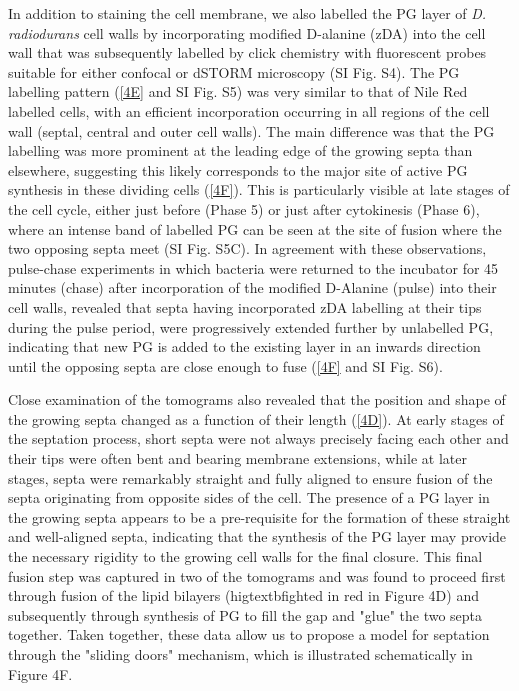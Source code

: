 In addition to staining the cell membrane, we also labelled the PG layer of \textit{D. radiodurans} cell walls by incorporating modified D-alanine (zDA) into the cell wall that was subsequently labelled by click chemistry with fluorescent probes suitable for either confocal or dSTORM microscopy (SI Fig. S4).
The PG labelling pattern (\autoref{4E} and SI Fig. S5) was very similar to that of Nile Red labelled cells, with an efficient incorporation occurring in all regions of the cell wall (septal, central and outer cell walls).
The main difference was that the PG labelling was more prominent at the leading edge of the growing septa than elsewhere, suggesting this likely corresponds to the major site of active PG synthesis in these dividing cells (\autoref{4F}).
This is particularly visible at late stages of the cell cycle, either just before (Phase 5) or just after cytokinesis (Phase 6), where an intense band of labelled PG can be seen at the site of fusion where the two opposing septa meet (SI Fig. S5C).
In agreement with these observations, pulse-chase experiments in which bacteria were returned to the incubator for 45 minutes (chase) after incorporation of the modified D-Alanine (pulse) into their cell walls, revealed that septa having incorporated zDA labelling at their tips during the pulse period, were progressively extended further by unlabelled PG, indicating that new PG is added to the existing layer in an inwards direction until the opposing septa are close enough to fuse (\autoref{4F} and SI Fig. S6).

Close examination of the tomograms also revealed that the position and shape of the growing septa changed as a function of their length (\autoref{4D}).
At early stages of the septation process, short septa were not always precisely facing each other and their tips were often bent and bearing membrane extensions, while at later stages, septa were remarkably straight and fully aligned to ensure fusion of the septa originating from opposite sides of the cell.
The presence of a PG layer in the growing septa appears to be a pre-requisite for the formation of these straight and well-aligned septa, indicating that the synthesis of the PG layer may provide the necessary rigidity to the growing cell walls for the final closure.
This final fusion step was captured in two of the tomograms and was found to proceed first through fusion of the lipid bilayers (higtextbfighted in red in Figure 4D) and subsequently through synthesis of PG to fill the gap and "glue" the two septa together.
Taken together, these data allow us to propose a model for septation through the "sliding doors" mechanism, which is illustrated schematically in Figure 4F.

